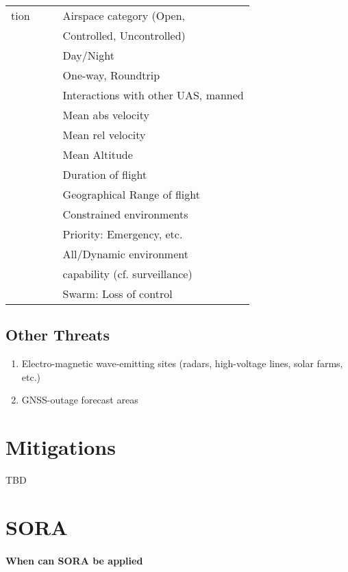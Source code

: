 \documentclass{ua_wgs_base}
\begin{document}
\begin{centering}
\begin{longtable}{|l|l|l|l|}
   tion & & & Airspace category (Open, \\
   & & & Controlled, Uncontrolled) \\\cline{4-4}
   & & & Day/Night \\\cline{4-4}
   & & & One-way, Roundtrip \\\cline{4-4}
   & & & Interactions with other UAS, manned \\\cline{4-4}
   & & & Mean abs velocity \\\cline{4-4}
   & & & Mean rel velocity \\\cline{4-4}
   & & & Mean Altitude \\\cline{4-4}
   & & & Duration of flight \\\cline{4-4}
   & & & Geographical Range of flight \\\cline{4-4}
   & & & Constrained environments \\\cline{4-4}
   & & & Priority: Emergency, etc. \\\cline{4-4}
   & & & All/Dynamic environment \\
   & & & capability (cf. surveillance) \\\cline{4-4}
   & & & Swarm: Loss of control \\\cline{1-4}

\hline
\end{longtable}
\end{centering}


\subsection{Other Threats}
\begin{enumerate}
\item Electro-magnetic wave-emitting sites (radars, high-voltage lines,
solar farms, etc.) 
\item GNSS-outage forecast areas
\end{enumerate}

\section{Mitigations}

TBD

\section{SORA}

\paragraph{When can SORA be applied}
\end{document}
